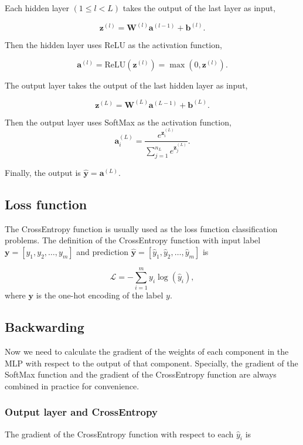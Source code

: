 \documentclass[12pt]{article}
\begin{document}
Each hidden layer $(1\le l < L)$ takes the output of the last layer as input,

$$
\mathbf{z}^{(l)} = \mathbf{W}^{(l)} \mathbf{a}^{(l-1)} + \mathbf{b}^{(l)}.
$$

Then the hidden layer uses ReLU as the activation function,

$$
\mathbf{a}^{(l)} = \text{ReLU}(\mathbf{z}^{(l)}) = \max(0, \mathbf{z}^{(l)}).
$$

The output layer takes the output of the last hidden layer as input,

$$
\mathbf{z}^{(L)} = \mathbf{W}^{(L)} \mathbf{a}^{(L-1)} + \mathbf{b}^{(L)}.
$$

Then the output layer uses SoftMax as the activation function,
$$
\mathbf{a}^{(L)}_i = \frac{e^{\mathbf{z}^{(L)}_i}}{\sum_{j=1}^{n_L} e^{\mathbf{z}^{(L)}_j}}.
$$

Finally, the output is $\hat{\mathbf{y}}=\mathbf{a}^{(L)}$.

\subsection{Loss function}

The CrossEntropy function is usually used as the loss function classification problems. The definition of the CrossEntropy function with input label $\mathbf{y} = [y_1, y_2, \dots, y_m]$ and prediction $\hat{\mathbf{y}} = [\hat{y}_1, \hat{y}_2, \dots, \hat{y}_m]$ is

$$
\mathcal{L} = -\sum_{i=1}^{m} y_i \log(\hat{y}_i),
$$ where $\mathbf{y}$ is the one-hot encoding of the label $y$.

\subsection{Backwarding}

Now we need to calculate the gradient of the weights of each component in the MLP with respect to the output of that component. Specially, the gradient of the SoftMax function and the gradient of the CrossEntropy function are always combined in practice for convenience.

\subsubsection{Output layer and CrossEntropy}

The gradient of the CrossEntropy function with respect to each $\hat{y}_i$ is
\end{document}
